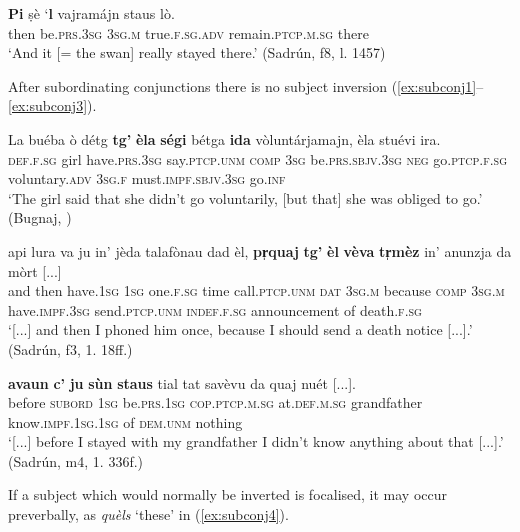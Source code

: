 \ea
\label{ex:aapi1}
	\gll   \textbf{Pi} ṣè `\textbf{l} vajramájn staus lò. \\
	then be.\textsc{prs.3sg} \textsc{3sg.m} true.\textsc{f.sg.adv} remain.\textsc{ptcp.m.sg} there\\
\glt `And it [= the swan] really stayed there.' (Sadrún, f8, l. 1457)
\z

After subordinating conjunctions there is no subject inversion (\ref{ex:subconj1}--\ref{ex:subconj3}).

\ea
\label{ex:subconj1}
\gll    La buéba ò détg \textbf{tg'} \textbf{èla} \textbf{ségi} bétga \textbf{ida} vòluntárjamajn, èla stuévi ira.\\
\textsc{def.f.sg} girl have.\textsc{prs.3sg} say.\textsc{ptcp.unm} \textsc{comp} \textsc{3sg} be.\textsc{prs.sbjv.3sg} \textsc{neg} go.\textsc{ptcp.f.sg} voluntary.\textsc{adv} \textsc{3sg.f} must.\textsc{impf.sbjv.3sg} go.\textsc{inf}\\
\glt `The girl said that she didn't go voluntarily, [but that] she was obliged to go.' (Bugnaj, \citealt[132]{Büchli1966})
\z

\ea
\label{ex:subconj2}
\gll  [...] api lura va ju in’ jèda talafònau dad èl, \textbf{pr̩quaj} \textbf{tg'} \textbf{èl} \textbf{vèva} \textbf{tr̩mèz} in’ anunzja da mòrt [...]\\
{} and then have.\textsc{1sg}  \textsc{1sg} one.\textsc{f.sg} time call.\textsc{ptcp.unm} \textsc{dat} \textsc{3sg.m} because \textsc{comp} \textsc{3sg.m} have.\textsc{impf.3sg} send.\textsc{ptcp.unm} \textsc{indef.f.sg} announcement of death.\textsc{f.sg}\\ 
\glt `[...] and then I phoned him once, because I should send a death notice [...].' (Sadrún, f3, 1. 18ff.)
\z

\ea
\label{ex:subconj3}
\gll  [...] \textbf{avaun} \textbf{c’} \textbf{ju} \textbf{sùn} \textbf{staus} tial tat savèvu da quaj nuét [...].\\
{} before \textsc{subord} \textsc{1sg} be.\textsc{prs.1sg} \textsc{cop.ptcp.m.sg} at.\textsc{def.m.sg} grandfather know.\textsc{impf.1sg.1sg} of \textsc{dem.unm} nothing\\
\glt `[...] before I stayed with my grandfather I didn’t know anything about that [...].' (Sadrún, m4, 1. 336f.)
\z

If a subject which would normally be inverted is focalised, it may occur preverbally, as \textit{quèls} `these' in (\ref{ex:subconj4}).

